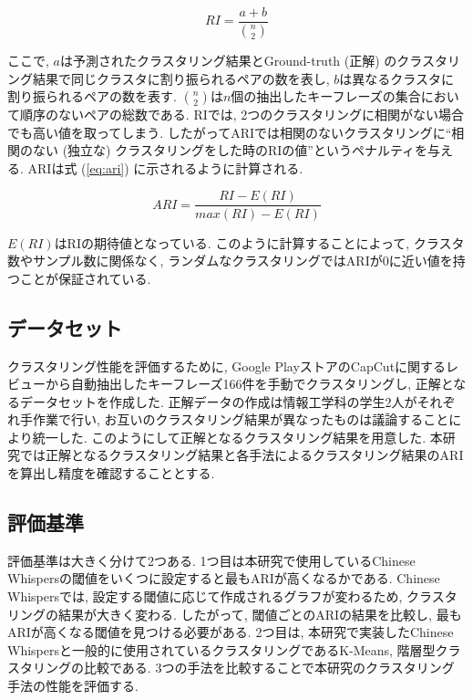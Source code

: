 \begin{equation}
  \label{eq:ri}
  RI = \frac{a+b}{\binom{n}{2}}
\end{equation}

ここで, \(a\)は予測されたクラスタリング結果とGround-truth (正解) のクラスタリング結果で同じクラスタに割り振られるペアの数を表し, \(b\)は異なるクラスタに割り振られるペアの数を表す. \(\binom{n}{2}\)は\(n\)個の抽出したキーフレーズの集合において順序のないペアの総数である. 
RIでは, 2つのクラスタリングに相関がない場合でも高い値を取ってしまう. したがってARIでは相関のないクラスタリングに``相関のない (独立な) クラスタリングをした時のRIの値''というペナルティを与える. ARIは式 (\ref{eq:ari}) に示されるように計算される. 

\begin{equation}
  \label{eq:ari}
  ARI = \frac{RI-E (RI) }{max (RI) -E (RI) }
\end{equation}

\(E(RI)\)はRIの期待値となっている. このように計算することによって, クラスタ数やサンプル数に関係なく, ランダムなクラスタリングではARIが0に近い値を持つことが保証されている. 

\subsection{データセット}
クラスタリング性能を評価するために, Google PlayストアのCapCutに関するレビューから自動抽出したキーフレーズ166件を手動でクラスタリングし, 正解となるデータセットを作成した. 正解データの作成は情報工学科の学生2人がそれぞれ手作業で行い, お互いのクラスタリング結果が異なったものは議論することにより統一した. 
このようにして正解となるクラスタリング結果を用意した. 本研究では正解となるクラスタリング結果と各手法によるクラスタリング結果のARIを算出し精度を確認することとする. 

\subsection{評価基準}
評価基準は大きく分けて2つある. 
1つ目は本研究で使用しているChinese Whispersの閾値をいくつに設定すると最もARIが高くなるかである. Chinese Whispersでは, 設定する閾値に応じて作成されるグラフが変わるため, クラスタリングの結果が大きく変わる. したがって, 閾値ごとのARIの結果を比較し, 最もARIが高くなる閾値を見つける必要がある. 
2つ目は, 本研究で実装したChinese Whispersと一般的に使用されているクラスタリングであるK-Means, 階層型クラスタリングの比較である. 3つの手法を比較することで本研究のクラスタリング手法の性能を評価する. 

